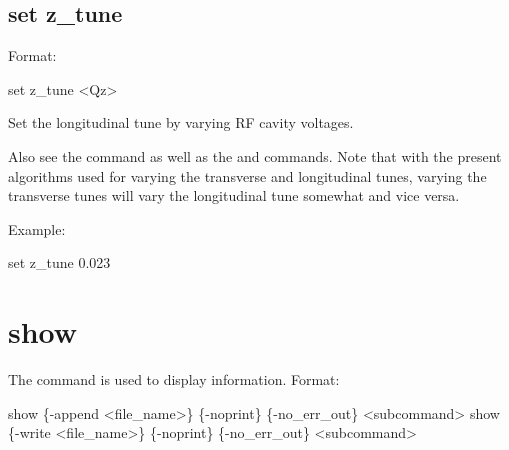 {{{{{{{\subsection{set z_tune}
\label{s:set.z.tune}

Format:
\begin{example}
  set z_tune <Qz>
\end{example}

Set the longitudinal tune by varying RF cavity voltages. 

Also see the  command as well as the  and  commands.
Note that with the present algorithms used for varying the transverse and longitudinal tunes,
varying the transverse tunes will vary the longitudinal tune somewhat and vice versa.

Example:
\begin{example}
  set z_tune 0.023
\end{example}


\section{show}
\label{s:show}

The  command is used to display information.
Format:
\begin{example}
  show \{-append <file_name>\} \{-noprint\} \{-no_err_out\} <subcommand>
  show \{-write <file_name>\} \{-noprint\} \{-no_err_out\} <subcommand>
\end{example}

}}}}}}}
